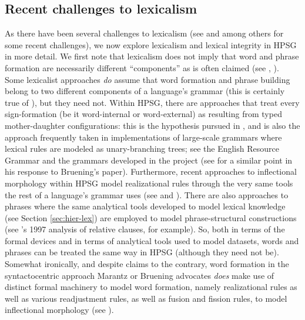 \documentclass[output=paper
                ,modfonts
                ,nonflat
	        ,collection
	        ,collectionchapter
	        ,collectiontoclongg
 	        ,biblatex
                ,babelshorthands
                ,newtxmath
                ,draftmode
                ,colorlinks, citecolor=brown
]{./langsci/langscibook}
\begin{document}
{\subsection{Recent challenges to lexicalism}

As there have been several challenges to lexicalism (see \citealt{Bruening2018} and  \citealt{Haspelmath2011} among others for some recent challenges), we now explore lexicalism and  lexical integrity in HPSG in more detail. We first note that lexicalism does not imply that word and phrase formation are necessarily different ``components'' as is often claimed (see \citealt{Marantz1997}, \citealt{Bruening2018}). Some lexicalist approaches \emph{do} assume that word formation and phrase building belong to two different components of a language's grammar (this is certainly true of \citealt{Jackendoff1975}), but they need not. Within HPSG, there are approaches that treat every sign-formation (be it word-internal or word-external) as resulting from typed mother-daughter configurations: this is the hypothesis pursued in \citealt{Koenig1999c}, and is also the approach frequently taken in implementations of large-scale grammars where lexical rules are modeled as unary-branching trees; see the English Resource Grammar \citep{Copestake2002} and the grammars developed in the  project \citep{Mueller2015}  (see \citealt[58]{MuellerLexicalism} for a similar point in his response to Bruening's paper). Furthermore, recent approaches to inflectional morphology within HPSG model realizational rules through the very same tools the rest of a language's grammar uses (see \citealt{CrysmannandBonami2016} and ).  There are also approaches to phrases where the same analytical tools developed to model lexical knowledge (see Section \ref{sec:hier-lex}) are employed to model phrase-structural constructions (see \citeauthor{Sag1997}'s 1997 analysis of relative clauses, for example). So, both in terms of the formal devices and in terms of analytical tools used to model datasets, words and phrases can be treated the same way in HPSG (although they need not be). Somewhat ironically, and despite claims to the contrary, word formation in the syntactocentric approach Marantz or Bruening advocates \emph{does} make use of distinct formal machinery to model word formation, namely realizational rules as well as various readjustment rules, as well as fusion and fission rules, to model inflectional morphology (see \citealt{HalleandMarantz1993,Embick2015}).

}
\end{document}
